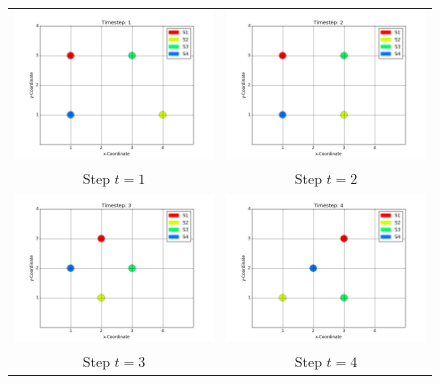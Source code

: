 \documentclass{scrartcl}
\begin{document}
\begin{figure}
\begin{tabular}{cc}
  \includegraphics[width=65mm]{routing_t_1.png} &   \includegraphics[width=65mm]{routing_t_2.png} \\
Step $t=1$ & Step $t=2$ \\[6pt]
 \includegraphics[width=65mm]{routing_t_3.png} &   \includegraphics[width=65mm]{routing_t_4.png} \\
Step $t=3$ & Step $t=4$ \\[6pt]

\end{tabular}
\end{figure}
\end{document}
